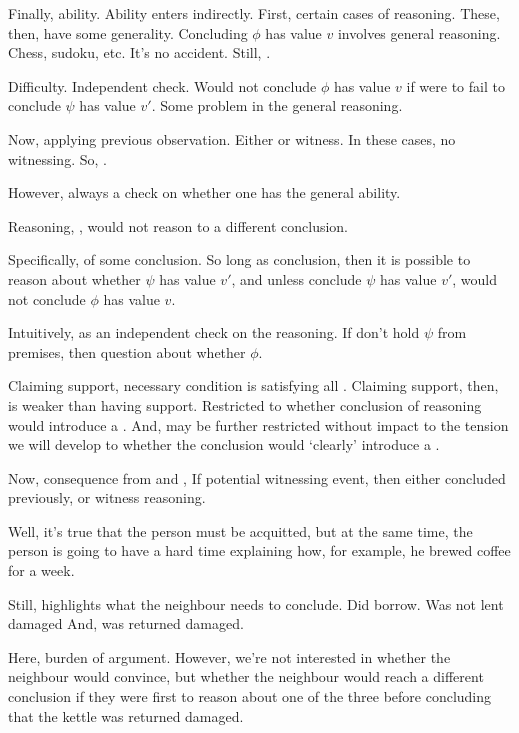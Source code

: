 \begin{note}
  Finally, ability.
  Ability enters indirectly.
  First, certain cases of reasoning.
  These, then, have some generality.
  Concluding \(\phi\) has value \(v\) involves general reasoning.
  Chess, sudoku, etc.
  It's no accident.
  Still, \csVed{}.

  Difficulty.
  Independent check.
  Would not conclude \(\phi\) has value \(v\) if were to fail to conclude \(\psi\) has value \(v'\).
  Some problem in the general reasoning.

  Now, applying previous observation.
  Either \csVed{} or witness.
  In these cases, no witnessing.
  So, \csVed{}.

  However, always a check on whether one has the general ability.
\end{note}

\begin{note}
  Reasoning, \support{}, would not reason to a different conclusion.

  Specifically, \requ{} of some conclusion.
  So long as conclusion, then it is possible to reason about whether \(\psi\) has value \(v'\), and unless conclude \(\psi\) has value \(v'\), would not conclude \(\phi\) has value \(v\).

  Intuitively, \requ{} as an independent check on the reasoning.
  If don't hold \(\psi\) from premises, then question about whether \(\phi\).

  Claiming support, necessary condition is satisfying all .
  Claiming support, then, is weaker than having support.
  Restricted to whether conclusion of reasoning would introduce a \requ{}.
  And, may be further restricted without impact to the tension we will develop to whether the conclusion would `clearly' introduce a \requ{}.
\end{note}

\begin{note}
  Now, consequence from \ideaCS{} and \ESU{},
  If potential witnessing event, then either concluded previously, or witness reasoning.
\end{note}

\begin{note}
  Well, it's true that the person must be acquitted, but at the same time, the person is going to have a hard time explaining how, for example, he brewed coffee for a week.

  Still, highlights what the neighbour needs to conclude.
  Did borrow.
  Was not lent damaged
  And, was returned damaged.

  Here, burden of argument.
  However, we're not interested in whether the neighbour would convince, but whether the neighbour would reach a different conclusion if they were first to reason about one of the three before concluding that the kettle was returned damaged.
\end{note}


